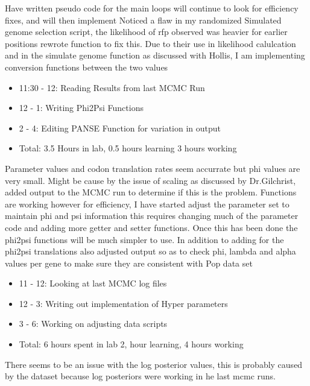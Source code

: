 \documentclass[12pt,hyperref]{labbook}
\begin{document}
Have written pseudo code for the main loops will continue to look for efficiency fixes, and will then implement
Noticed a flaw in my randomized Simulated genome selection script, the likelihood of rfp observed was heavier for earlier positions rewrote function to fix this.
Due to their use in likelihood calulcation and in the simulate genome function as discussed with Hollis, I am implementing conversion functions between the two values
\begin{itemize}
    \item 11:30 - 12: Reading Results from last MCMC Run
    \item 12 - 1: Writing Phi2Psi Functions
    \item 2 - 4: Editing PANSE Function for variation in output
    \item Total: 3.5 Hours in lab, 0.5 hours learning 3 hours working
\end{itemize}
Parameter values and codon translation rates seem accurrate but phi values are very small. Might be cause by the issue of scaling as discussed by Dr.Gilchrist, added output to the MCMC run to determine if this is the problem.
Functions are working however for efficiency, I have started adjust the parameter set to maintain phi and psi information this requires changing much of the parameter code and adding more getter and setter functions. Once this has been done the phi2psi functions will be much simpler to use.
In addition to adding for the phi2psi translations also adjusted output so as to check phi, lambda and alpha values per gene to make sure they are consistent with Pop data set
\begin{itemize}
    \item 11 - 12: Looking at last MCMC log files
    \item 12 - 3: Writing out implementation of Hyper parameters
    \item 3 - 6: Working on adjusting data scripts
    \item Total: 6 hours spent in lab 2, hour learning, 4 hours working
\end{itemize}
There seems to be an issue with the log posterior values, this is probably caused by the dataset because log posteriors were working in he last mcmc runs.
\end{document}
